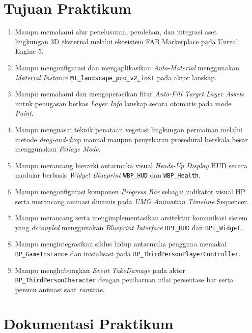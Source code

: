 \documentclass[a4paper,oneside,11pt]{book}
\begin{document}
\section{Tujuan Praktikum}
\begin{enumerate}[label=\arabic*.]
  \item Mampu memahami alur penelusuran, perolehan, dan integrasi aset lingkungan 3D eksternal melalui ekosistem FAB Marketplace pada Unreal Engine 5.
  \item Mampu mengonfigurasi dan mengaplikasikan \textit{Auto-Material} menggunakan \textit{Material Instance} \texttt{MI\_landscape\_pro\_v2\_inst} pada aktor lanskap.
  \item Mampu memahami dan mengoperasikan fitur \textit{Auto-Fill Target Layer Assets} untuk penugasan berkas \textit{Layer Info} lanskap secara otomatis pada mode \textit{Paint}.
  \item Mampu menguasai teknik penataan vegetasi lingkungan permainan melalui metode \textit{drag-and-drop} manual maupun penyebaran prosedural berskala besar menggunakan \textit{Foliage Mode}.
  \item Mampu merancang hierarki antarmuka visual \textit{Heads-Up Display} HUD secara modular berbasis \textit{Widget Blueprint} \texttt{WBP\_HUD} dan \texttt{WBP\_Health}.
  \item Mampu mengonfigurasi komponen \textit{Progress Bar} sebagai indikator visual HP serta merancang animasi dinamis pada \textit{UMG Animation Timeline} Sequencer.
  \item Mampu merancang serta mengimplementasikan arsitektur komunikasi sistem yang \textit{decoupled} menggunakan \textit{Blueprint Interface} \texttt{BPI\_HUD} dan \texttt{BPI\_Widget}.
  \item Mampu mengintegrasikan siklus hidup antarmuka pengguna memakai \texttt{BP\_GameInstance} dan inisialisasi pada \texttt{BP\_ThirdPersonPlayerController}.
  \item Mampu menghubungkan \textit{Event TakeDamage} pada aktor \texttt{BP\_ThirdPersonCharacter} dengan pembaruan nilai persentase bar serta pemicu animasi saat \textit{runtime}.
\end{enumerate}

\section{Dokumentasi Praktikum}
\end{document}
